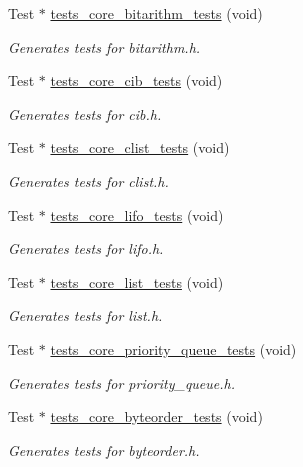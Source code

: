 \begin{DoxyCompactItemize}
Test $\ast$ \hyperlink{group__unittests_ga0e92d30389bd2bf5e8482efa37e34733}{tests\+\_\+core\+\_\+bitarithm\+\_\+tests} (void)
\begin{DoxyCompactList}\small\item\em Generates tests for bitarithm.\+h. \end{DoxyCompactList}\item 
Test $\ast$ \hyperlink{group__unittests_gaf6c587a2b7c4b7284754cb254d828ae4}{tests\+\_\+core\+\_\+cib\+\_\+tests} (void)
\begin{DoxyCompactList}\small\item\em Generates tests for cib.\+h. \end{DoxyCompactList}\item 
Test $\ast$ \hyperlink{group__unittests_gac88d9e2710f9a1471a063c472ba78310}{tests\+\_\+core\+\_\+clist\+\_\+tests} (void)
\begin{DoxyCompactList}\small\item\em Generates tests for clist.\+h. \end{DoxyCompactList}\item 
Test $\ast$ \hyperlink{group__unittests_ga00403c34e425101181fbebfe68dc0e33}{tests\+\_\+core\+\_\+lifo\+\_\+tests} (void)
\begin{DoxyCompactList}\small\item\em Generates tests for lifo.\+h. \end{DoxyCompactList}\item 
Test $\ast$ \hyperlink{group__unittests_gac59771a00b4ae805ba06afd6e93578cb}{tests\+\_\+core\+\_\+list\+\_\+tests} (void)
\begin{DoxyCompactList}\small\item\em Generates tests for list.\+h. \end{DoxyCompactList}\item 
Test $\ast$ \hyperlink{group__unittests_ga5f7e66228b199fc4a8938d67b5bfbdce}{tests\+\_\+core\+\_\+priority\+\_\+queue\+\_\+tests} (void)
\begin{DoxyCompactList}\small\item\em Generates tests for priority\+\_\+queue.\+h. \end{DoxyCompactList}\item 
Test $\ast$ \hyperlink{group__unittests_ga664f87f90c88e1bb9d124238e01076d1}{tests\+\_\+core\+\_\+byteorder\+\_\+tests} (void)
\begin{DoxyCompactList}\small\item\em Generates tests for byteorder.\+h. \end{DoxyCompactList}\item 

\end{DoxyCompactItemize}
